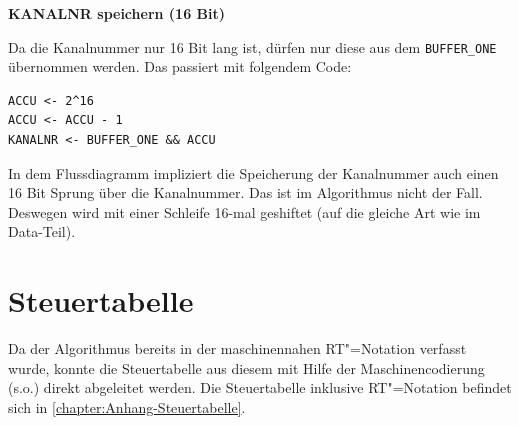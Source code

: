 \textbf{KANALNR speichern (16 Bit)}

Da die Kanalnummer nur 16 Bit lang ist, dürfen nur diese aus dem \texttt{BUFFER\_ONE} übernommen werden. Das passiert mit folgendem Code:

\begin{verbatim}
ACCU <- 2^16
ACCU <- ACCU - 1
KANALNR <- BUFFER_ONE && ACCU
\end{verbatim}

In dem Flussdiagramm impliziert die Speicherung der Kanalnummer auch einen 16 Bit Sprung über die Kanalnummer. Das ist im Algorithmus nicht der Fall. Deswegen wird mit einer Schleife 16-mal geshiftet (auf die gleiche Art wie im Data-Teil).





\section{Steuertabelle}
\label{section:Dokumentation-Implementierung-Steuertabelle}

Da der Algorithmus bereits in der maschinennahen RT"=Notation verfasst wurde, konnte die Steuertabelle aus diesem mit Hilfe der Maschinencodierung (s.o.) direkt abgeleitet werden. Die Steuertabelle inklusive RT"=Notation befindet sich in \autoref{chapter:Anhang-Steuertabelle}.
